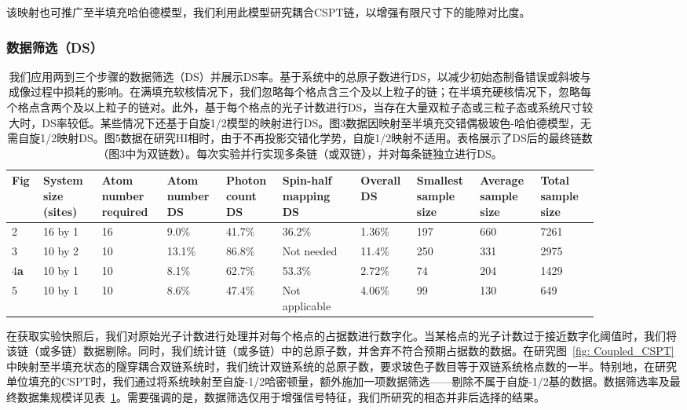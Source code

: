 \documentclass[preprint,superscriptaddress,floatfix, nofootinbib]{revtex4-2}
\begin{document}
该映射也可推广至半填充哈伯德模型，我们利用此模型研究耦合CSPT链，以增强有限尺寸下的能隙对比度。
\subsubsection*{数据筛选（DS）}

\begin{table}[ht]
\begin{ruledtabular}
\begin{tabular}{p{0.04\linewidth} | p{0.09\linewidth} | p{0.1\linewidth} | p{0.09\linewidth} | p{0.08\linewidth} | p{0.12\linewidth} | p{0.08\linewidth} | p{0.09\linewidth} | p{0.09\linewidth} | p{0.09\linewidth}}
    Fig & System size (sites) & Atom number required & Atom number DS & Photon count DS & Spin-half mapping DS & Overall DS & Smallest sample size & Average sample size & Total sample size \\
    \hline
    2 & 16 by 1 & 16 & 9.0\% & 41.7\% & 36.2\% & 1.36\% & 197 & 660 & 7261 \\
    3 & 10 by 2 & 10 & 13.1\% & 86.8\% & Not needed & 11.4\% & 250 & 331 & 2975 \\
    4\textbf{a} & 10 by 1 & 10 & 8.1\% & 62.7\% & 53.3\% & 2.72\% & 74 & 204 & 1429 \\
    5 & 10 by 1 & 10 & 8.6\% & 47.4\% & Not applicable & 4.06\% & 99 & 130 & 649
\end{tabular}
\end{ruledtabular}
\caption{\label{tab:data_size} 我们应用两到三个步骤的数据筛选（DS）并展示DS率。基于系统中的总原子数进行DS，以减少初始态制备错误或斜坡与成像过程中损耗的影响。在满填充软核情况下，我们忽略每个格点含三个及以上粒子的链；在半填充硬核情况下，忽略每个格点含两个及以上粒子的链对。此外，基于每个格点的光子计数进行DS，当存在大量双粒子态或三粒子态或系统尺寸较大时，DS率较低。某些情况下还基于自旋1/2模型的映射进行DS。图3数据因映射至半填充交错偶极玻色-哈伯德模型，无需自旋1/2映射DS。图5数据在研究HI相时，由于不再投影交错化学势，自旋1/2映射不适用。表格展示了DS后的最终链数（图3中为双链数）。每次实验并行实现多条链（或双链），并对每条链独立进行DS。}
\end{table}

在获取实验快照后，我们对原始光子计数进行处理并对每个格点的占据数进行数字化。当某格点的光子计数过于接近数字化阈值时，我们将该链（或多链）数据剔除。同时，我们统计链（或多链）中的总原子数，并舍弃不符合预期占据数的数据。在研究图~\ref{fig: Coupled_CSPT}中映射至半填充状态的隧穿耦合双链系统时，我们统计双链系统的总原子数，要求玻色子数目等于双链系统格点数的一半。特别地，在研究单位填充的CSPT时，我们通过将系统映射至自旋-1/2哈密顿量，额外施加一项数据筛选——剔除不属于自旋-1/2基的数据。数据筛选率及最终数据集规模详见表~\ref{tab:data_size}。需要强调的是，数据筛选仅用于增强信号特征，我们所研究的相态并非后选择的结果。
\end{document}
